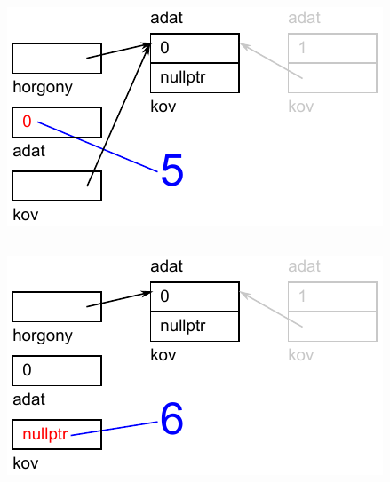 \begin{frame}
  \begin{columns}[c]
      \footnotesize
      \begin{exampleblock}{}
        
      \end{exampleblock}
      \includegraphics[width=\textwidth]{verem/verem14.pdf}
  \end{columns}
\end{frame}

\begin{frame}
  \begin{columns}[c]
      \footnotesize
      \begin{exampleblock}{}
        
      \end{exampleblock}
      \includegraphics[width=\textwidth]{verem/verem15.pdf}
  \end{columns}
\end{frame}

